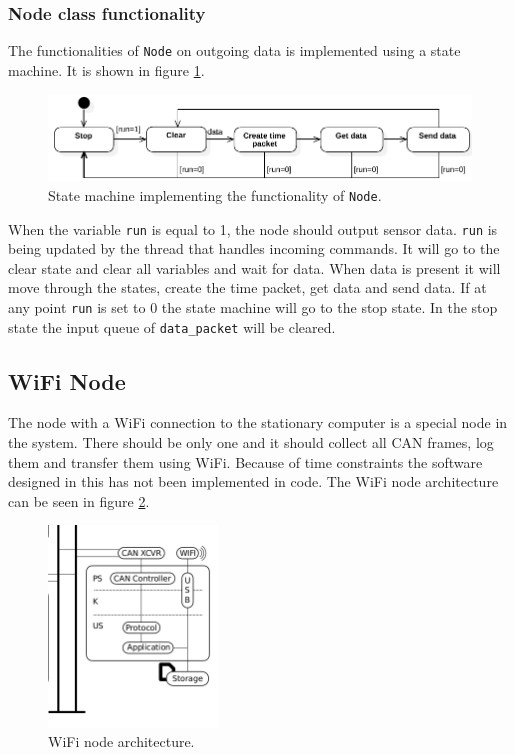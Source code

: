 \subsubsection*{Node class functionality}
The functionalities of \texttt{Node} on outgoing data is implemented using a state machine.
It is shown in figure \ref{fig:state_machine}.
\begin{figure}[!h]
\centering
\includegraphics[width=1\textwidth]{graphics/StateDiagram_Node.pdf}
\caption{State machine implementing the functionality of \texttt{Node}. }
\label{fig:state_machine}
\end{figure}
When the variable \texttt{run} is equal to 1, the node should output sensor data.
\texttt{run} is being updated by the thread that handles incoming commands.
It will go to the clear state and clear all variables and wait for data. 
When data is present it will move through the states, create the time packet, get data and send data. 
If at any point \texttt{run} is set to 0 the state machine will go to the stop state.
In the stop state the input queue of \texttt{data\_packet} will be cleared.


\subsection{WiFi Node}
The node with a WiFi connection to the stationary computer is a special node in the system.
There should be only one and it should collect all CAN frames, log them and transfer them using WiFi.
Because of time constraints the software designed in this has not been implemented in code.
The WiFi node architecture can be seen in figure \ref{fig:wifi_node}.

\begin{figure}[!h]
\centering
\includegraphics[width=0.4\textwidth]{graphics/wifi_node}
\caption{WiFi node architecture.}
\label{fig:wifi_node}
\end{figure}

